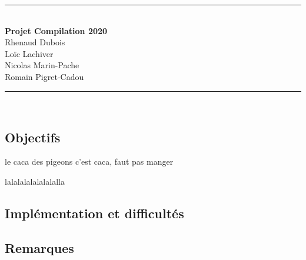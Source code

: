\documentclass[12pt, a4paper]{article}
\begin{document}


\begin{center}
    \rule{\linewidth}{0.5mm} \\
    \Large\textbf{Projet Compilation 2020\\}
    Rhenaud Dubois\\
    Loïc Lachiver\\
    Nicolas Marin-Pache\\
    Romain Pigret-Cadou
    
    \rule{\linewidth}{0.5mm} \\
\end{center}



\subsection*{Objectifs}
le caca des pigeons c'est caca, faut pas manger
\begin{codequote}
    lalalalalalalalalla
\end{codequote}
\vspace{1cm}


\subsection*{Implémentation et difficultés}






\subsection*{Remarques}
\end{document}
